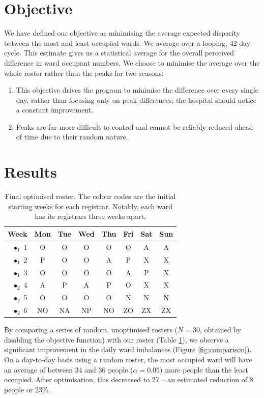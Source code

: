\documentclass[a4paper]{article}
\begin{document}
\section{Objective}

We have defined our objective as minimising the average expected disparity between the most and least occupied wards. We average over a looping, 42-day cycle. This estimate gives us a statistical average for the overall perceived difference in ward occupant numbers. We choose to minimise the average over the whole roster rather than the peaks for two reasons:
\begin{enumerate}[noitemsep, topsep=-6pt]
\item This objective drives the program to minimise the difference over every single day, rather than focusing only on peak differences; the hospital should notice a constant improvement.
\item Peaks are far more difficult to control and cannot be reliably reduced ahead of time due to their random nature.
\end{enumerate}

\section{Results}
\begin{table}[h]
\centering
\caption{Final optimised roster. The colour codes are the initial starting weeks for each registrar. Notably, each ward has its registrars three weeks apart.}
\label{tab:roster}
\begin{tabular}{r|ccccccc}
Week	&Mon	&Tue	&Wed	&Thu	&Fri	&Sat	&Sun	\\
\hline
{\color{LIME}$\bullet_1$} 1	& O	& O	& O	& O	& O	& A	& A	\\
{\color{NAVY}$\bullet_1$} 2	& P	& O	& O	& A	& P	& X	& X	\\
{\color{YELLOW}$\bullet_1$} 3	& O	& O	& O	& O	& A	& P	& X	\\
{\color{LIME}$\bullet_2$} 4	& A	& P	& A	& P	& O	& X	& X	\\
{\color{NAVY}$\bullet_2$} 5	& O	& O	& O	& O	& N	& N	& N	\\
{\color{YELLOW}$\bullet_2$} 6	& NO	& NA	& NP	& NO	& ZO	& ZX	& ZX	\\
\end{tabular}
\end{table}

By comparing a series of random, unoptimised rosters ($N=30$, obtained by disabling the objective function) with our roster (Table \ref{tab:roster}), we observe a significant improvement in the daily ward imbalances (Figure \ref{fig:comparison}). On a day-to-day basis using a random roster, the most occupied ward will have an average of between 34 and 36 people ($\alpha = 0.05$) more people than the least occupied. After optimisation, this decreased to 27 -- an estimated reduction of 8 people or 23\%.
\end{document}
